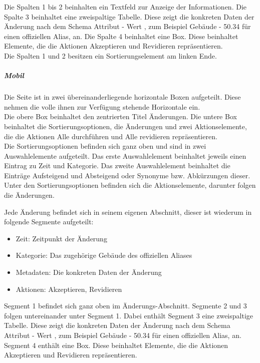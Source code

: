 Die Spalten 1 bis 2 beinhalten ein Textfeld zur Anzeige der Informationen.
Die Spalte 3 beinhaltet eine zweispaltige Tabelle. Diese zeigt die konkreten Daten der Änderung nach dem Schema \dq Attribut - Wert \dq{}, zum Beispiel \dq Gebäude - 50.34 \dq{} für einen offiziellen Alias, an.
Die Spalte 4 beinhaltet eine Box. Diese beinhaltet Elemente, die die Aktionen \dq Akzeptieren \dq{} und \dq Revidieren \dq{} repräsentieren. \\
Die Spalten 1 und 2 besitzen ein Sortierungselement am linken Ende.

\subparagraph*{Mobil}
Die Seite ist in zwei übereinanderliegende horizontale Boxen aufgeteilt. Diese nehmen die volle ihnen zur Verfügung stehende Horizontale ein. \\
Die obere Box beinhaltet den zentrierten Titel \dq Änderungen\dq.
Die untere Box beinhaltet die Sortierungsoptionen, die Änderungen und zwei Aktionselemente, die die Aktionen \dq Alle durchführen\dq{} und \dq Alle revidieren\dq{} repräsentieren. \\
Die Sortierungsoptionen befinden sich ganz oben und sind in zwei Auswahlelemente aufgeteilt. 
Das erste Auswahlelement beinhaltet jeweils einen Eintrag zu Zeit und Kategorie.
Das zweite Auswahlelement beinhaltet die Einträge \dq Aufsteigend \dq{} und \dq Absteigend \dq{} oder Synonyme bzw. Abkürzungen dieser.\\
Unter den Sortierungsoptionen befinden sich die Aktionselemente, darunter folgen die Änderungen.

Jede Änderung befindet sich in seinem eigenen Abschnitt, dieser ist wiederum in folgende Segmente aufgeteilt:

\begin{itemize}
    \item Zeit: Zeitpunkt der Änderung
    \item Kategorie: Das zugehörige Gebäude des offiziellen Aliases
    \item Metadaten: Die konkreten Daten der Änderung
    \item Aktionen: Akzeptieren, Revidieren
\end{itemize}

Segment 1 befindet sich ganz oben im Änderungs-Abschnitt. Segmente 2 und 3 folgen untereinander unter Segment 1.
Dabei enthält Segment 3 eine zweispaltige Tabelle. Diese zeigt die konkreten Daten der Änderung nach dem Schema \dq Attribut - Wert \dq{}, zum Beispiel \dq Gebäude - 50.34 \dq{} für einen offiziellen Alias, an.
Segment 4 enthält eine Box. Diese beinhaltet Elemente, die die Aktionen \dq Akzeptieren \dq{} und \dq Revidieren \dq{} repräsentieren.

